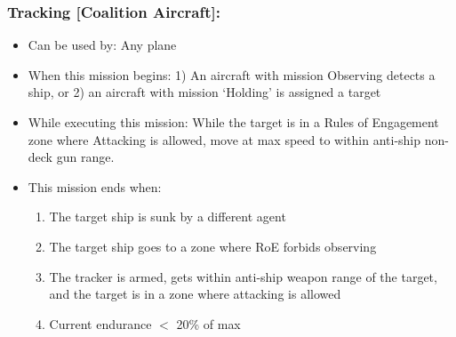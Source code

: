 \documentclass{article}
\begin{document}
    \subsubsection{Tracking [Coalition Aircraft]:} 
            \begin{itemize}
                \item{Can be used by:} Any plane
                \item{When this mission begins:} 1) An aircraft with mission Observing detects a ship, or 2) an aircraft with mission `Holding' is assigned a target
                \item{While executing this mission:} While the target is in a Rules of Engagement zone where Attacking is allowed, move at max speed to within anti-ship non-deck gun range.
                \item{This mission ends when:} 
                \begin{enumerate}[label=\arabic*)]
                    \item The target ship is sunk by a different agent \par
                    [Escort resumes player-assigned mission]
                    \item The target ship goes to a zone where RoE forbids observing \par
                    [Escort resumes player-assigned mission]
                    \item The tracker is armed, gets within anti-ship weapon range of the target, and the target is in a zone where attacking is allowed \par
                    [Aircraft begins mission Attacking Ship - Non-Deckgun]
                    \item Current endurance $<$ 20\% of max \par
                    [Aircraft begins mission Return to Base]
                \end{enumerate}
            \end{itemize}
\end{document}
